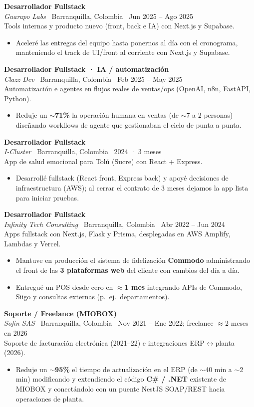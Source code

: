 \documentclass[10.5pt,a4paper]{article}
\newcommand{\Job}[4]{%
  \noindent\textbf{#1}\\[-0.05em]
  {\small\textit{#2} \textbar\ #4 \textbar\ #3}\\[0.15em]
}
\begin{document}
\vspace{0.35em}
\Job{Desarrollador Fullstack}{Guarapo Labs}{Jun 2025 -- Ago 2025}{Barranquilla, Colombia}
Tools internas y producto nuevo (front, back e IA) con Next.js y Supabase.
\begin{itemize}
  \item Aceleré las entregas del equipo hasta ponernos al día con el cronograma,
        manteniendo el track de UI/front al corriente con Next.js y Supabase.
\end{itemize}

\vspace{0.35em}
\Job{Desarrollador Fullstack · IA / automatización}{Clazz Dev}{Feb 2025 -- May 2025}{Barranquilla, Colombia}
Automatización e agentes en flujos reales de ventas/ops (OpenAI, n8n, FastAPI, Python).
\begin{itemize}
  \item Reduje un $\sim$\textbf{71\%} la operación humana en ventas (de $\sim$7 a 2 personas)
        diseñando workflows de agente que gestionaban el ciclo de punta a punta.
\end{itemize}

\vspace{0.35em}
\Job{Desarrollador Fullstack}{I-Cluster}{2024 · 3 meses}{Barranquilla, Colombia}
App de salud emocional para Tolú (Sucre) con React + Express.
\begin{itemize}
  \item Desarrollé fullstack (React front, Express back) y apoyé decisiones de
        infraestructura (AWS); al cerrar el contrato de 3 meses dejamos la app lista
        para iniciar pruebas.
\end{itemize}

\vspace{0.35em}
\Job{Desarrollador Fullstack}{Infinity Tech Consulting}{Abr 2022 -- Jun 2024}{Barranquilla, Colombia}
Apps fullstack con Next.js, Flask y Prisma, desplegadas en AWS Amplify, Lambdas y Vercel.
\begin{itemize}
  \item Mantuve en producción el sistema de fidelización \textbf{Commodo} administrando
        el front de las \textbf{3 plataformas web} del cliente con cambios del día a día.
  \item Entregué un POS desde cero en $\approx$\textbf{1 mes} integrando APIs de Commodo,
        Siigo y consultas externas (p.\ ej.\ departamentos).
\end{itemize}

\vspace{0.35em}
\Job{Soporte / Freelance (MIOBOX)}{Sofin SAS}{Nov 2021 -- Ene 2022; freelance $\approx$2 meses en 2026}{Barranquilla, Colombia}
Soporte de facturación electrónica (2021--22) e integraciones ERP$\leftrightarrow$planta (2026).
\begin{itemize}
  \item Reduje un $\sim$\textbf{95\%} el tiempo de actualización en el ERP (de $\sim$40 min
        a $\sim$2 min) modificando y extendiendo el código \textbf{C\# / .NET} existente de
        MIOBOX y conectándolo con un puente NestJS SOAP/REST hacia operaciones de planta.
\end{itemize}
\end{document}
